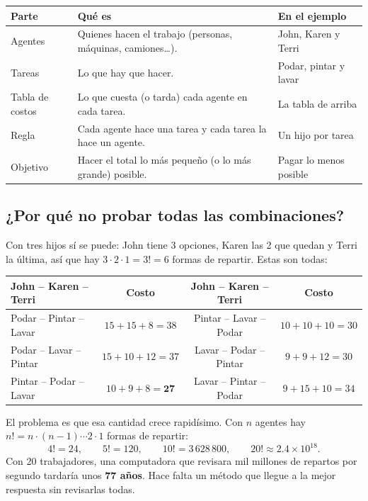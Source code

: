 \documentclass[11pt,a4paper]{article}
\begin{document}
\begin{center}\small
\begin{tabular}{p{3.2cm}p{6.4cm}p{4.6cm}}
\toprule
\textbf{Parte} & \textbf{Qué es} & \textbf{En el ejemplo} \\
\midrule
Agentes & Quienes hacen el trabajo (personas, máquinas, camiones\dots). & John, Karen y Terri \\
Tareas & Lo que hay que hacer. & Podar, pintar y lavar \\
Tabla de costos & Lo que cuesta (o tarda) cada agente en cada tarea. & La tabla de arriba \\
Regla & Cada agente hace una tarea y cada tarea la hace un agente. & Un hijo por tarea \\
Objetivo & Hacer el total lo más pequeño (o lo más grande) posible. & Pagar lo menos posible \\
\bottomrule
\end{tabular}
\end{center}

\subsection*{¿Por qué no probar todas las combinaciones?}
Con tres hijos sí se puede: John tiene 3 opciones, Karen las 2 que quedan y Terri la última, así que hay
$3 \cdot 2 \cdot 1 = 3! = 6$ formas de repartir. Estas son todas:

\begin{center}\small
\begin{tabular}{lccc}
\toprule
\textbf{John -- Karen -- Terri} & \textbf{Costo} & \textbf{John -- Karen -- Terri} & \textbf{Costo} \\
\midrule
Podar -- Pintar -- Lavar & $15 + 15 + 8 = 38$ & Pintar -- Lavar -- Podar & $10 + 10 + 10 = 30$ \\
Podar -- Lavar -- Pintar & $15 + 10 + 12 = 37$ & Lavar -- Podar -- Pintar & $9 + 9 + 12 = 30$ \\
Pintar -- Podar -- Lavar & $10 + 9 + 8 = \mathbf{27}$ & Lavar -- Pintar -- Podar & $9 + 15 + 10 = 34$ \\
\bottomrule
\end{tabular}
\end{center}

El problema es que esa cantidad crece rapidísimo. Con $n$ agentes hay $n! = n\cdot(n-1)\cdots 2\cdot 1$
formas de repartir:
\[
4! = 24, \qquad 5! = 120, \qquad 10! = 3\,628\,800, \qquad 20! \approx 2.4 \times 10^{18}.
\]
Con 20 trabajadores, una computadora que revisara mil millones de repartos por segundo tardaría unos
\textbf{77 años}. Hace falta un método que llegue a la mejor respuesta sin revisarlas todas.
\end{document}
